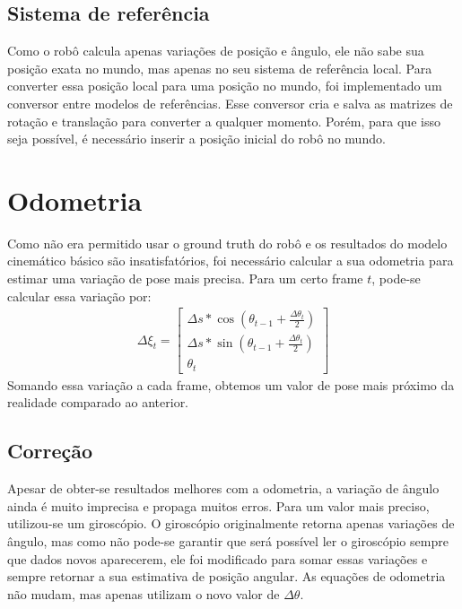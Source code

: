 \documentclass[twoside,conference,a4paper]{IEEEtran}
\begin{document}
\subsection{Sistema de referência}

Como o robô calcula apenas variações de posição e ângulo, ele não sabe sua posição exata no mundo, mas apenas no seu sistema de referência local. Para converter essa posição local para uma posição no mundo, foi implementado um conversor entre modelos de referências. Esse conversor cria e salva as matrizes de rotação e translação para converter a qualquer momento. Porém, para que isso seja possível, é necessário inserir a posição inicial do robô no mundo.

\section{Odometria}

Como não era permitido usar o ground truth do robô e os resultados do modelo cinemático básico são insatisfatórios, foi necessário calcular a sua odometria para estimar uma variação de pose mais precisa. Para um certo frame $t$, pode-se calcular essa variação por:
\begin{gather*}
\Delta \xi_{t} =
\begin{bmatrix}
\Delta s * \cos(\theta_{t-1} + \frac{\Delta \theta_{t}}{2}) \\
\Delta s * \sin(\theta_{t-1} + \frac{\Delta \theta_{t}}{2}) \\
\theta_{t}
\end{bmatrix}
\end{gather*}
Somando essa variação a cada frame, obtemos um valor de pose mais próximo da realidade comparado ao anterior.

\subsection{Correção}

Apesar de obter-se resultados melhores com a odometria, a variação de ângulo ainda é muito imprecisa e propaga muitos erros. Para um valor mais preciso, utilizou-se um giroscópio. O giroscópio originalmente retorna apenas variações de ângulo, mas como não pode-se garantir que será possível ler  o giroscópio sempre que dados novos aparecerem, ele foi modificado para somar essas variações e sempre retornar a sua estimativa de posição angular. As equações de odometria não mudam, mas apenas utilizam o novo valor de $\Delta \theta$.
\end{document}
